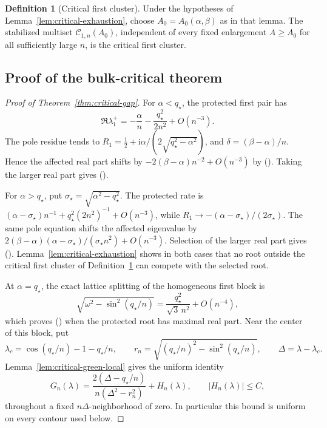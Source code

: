 \documentclass[twoside,10pt]{article}
\numberwithin{equation}{section}
\theoremstyle{slbody}
\theoremstyle{definition}
\newtheorem{definition}[theorem]{Definition}
\theoremstyle{remark}
\newcommand{\ii}{\mathrm i}
\renewcommand{\eqref}[1]{%
  \textup{{\normalfont(\oldstylenums{\ref{#1}}}\normalfont)}}
\begin{document}
\begin{definition}[Critical first cluster]\label{def:critical-first-cluster}
Under the hypotheses of Lemma~\ref{lem:critical-exhaustion}, choose
$A_0=A_0(\alpha,\beta)$ as in that lemma.  The stabilized multiset
$\mathcal C_{1,n}(A_0)$, independent of every fixed enlargement
$A\ge A_0$ for all sufficiently large $n$, is the critical first
cluster.
\end{definition}

\subsection{Proof of the bulk-critical theorem}

\begin{proof}[Proof of Theorem~\ref{thm:critical-gap}]
For $\alpha<q_\star$, the protected first pair has
\[
 \Re\lambda_1^+=-\frac{\alpha}{n}-\frac{q_\star^2}{2n^2}
 +O(n^{-3}).
\]
The pole residue tends to
$R_1=\tfrac12+\ii\alpha/(2\sqrt{q_\star^2-\alpha^2})$, and
$\delta=(\beta-\alpha)/n$.  Hence the affected real part shifts by
$-2(\beta-\alpha)n^{-2}+O(n^{-3})$ by
\eqref{eq:critical-uniform-simple-shift}.  Taking the larger real part
gives \eqref{eq:critical-below}.

For $\alpha>q_\star$, put
$\sigma_\star=\sqrt{\alpha^2-q_\star^2}$.  The protected rate is
$(\alpha-\sigma_\star)n^{-1}+q_\star^2(2n^2)^{-1}+O(n^{-3})$, while
$R_1\to-(\alpha-\sigma_\star)/(2\sigma_\star)$.  The same pole equation
shifts the affected eigenvalue by
$2(\beta-\alpha)(\alpha-\sigma_\star)/(\sigma_\star n^2)+O(n^{-3})$.
Selection of the larger real part gives \eqref{eq:critical-above}.
Lemma~\ref{lem:critical-exhaustion} shows in both cases that no root
outside the critical first cluster of
Definition~\ref{def:critical-first-cluster} can compete with the selected
root.

At $\alpha=q_\star$, the exact lattice splitting of the homogeneous first
block is
\[
 \sqrt{\omega^2-\sin^2(q_\star/n)}
   =\frac{q_\star^2}{\sqrt3\,n^2}+O(n^{-4}),
\]
which proves \eqref{eq:critical-at-slow} when the protected root has
maximal real part.
Near the center of this block, put
\[
 \lambda_c=\cos(q_\star/n)-1-q_\star/n,\qquad
 r_n=\sqrt{(q_\star/n)^2-\sin^2(q_\star/n)},\qquad
 \Delta=\lambda-\lambda_c.
\]
Lemma~\ref{lem:critical-green-local} gives the uniform identity
\begin{equation}\label{eq:critical-green-two-terms}
 G_n(\lambda)
 =\frac{2(\Delta-q_\star/n)}{n(\Delta^2-r_n^2)}+H_n(\lambda),
 \qquad |H_n(\lambda)|\le C,
\end{equation}
throughout a fixed $n\Delta$-neighborhood of zero.  In particular this
bound is uniform on every contour used below.


\end{proof}
\end{document}
